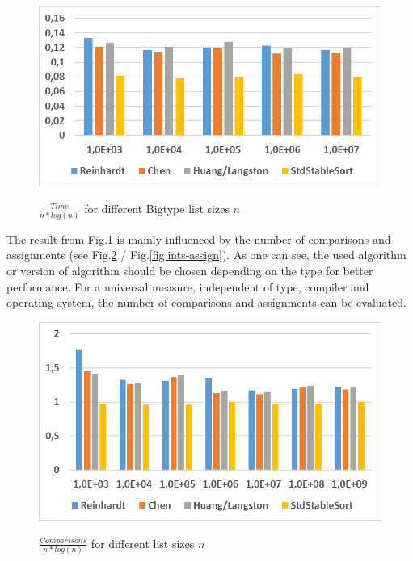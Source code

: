\documentclass[11pt,pdftex,a4paper, twocolumn]{article}
\begin{document}
\begin{figure}[H]
\includegraphics[width=\linewidth]{Diagramm-Bilder/big-beidesTeuer.JPG} \\
\caption{ $ \frac{Time}{n*log(n)} $ for different Bigtype list sizes $ n $ } \label{fig:big-beides-Teuer}
\end{figure}
The result from Fig.\ref{fig:big-beides-Teuer} is mainly influenced by the number of comparisons and assignments (see Fig.\ref{fig:ints-comp} / Fig.\ref{fig:ints-assign}). As one can see, the used algorithm or version of algorithm should be chosen depending on the type for better performance. For a universal measure, independent of type, compiler and operating system, the number of comparisons and assignments can be evaluated. \\
\begin{figure}[H]
\includegraphics[width=\linewidth]{Diagramm-Bilder/ints-comparisons.JPG} \\
\caption{ $ \frac{Comparisons}{n*log(n)} $ for different list sizes $ n $ } \label{fig:ints-comp}
\end{figure}
\end{document}
